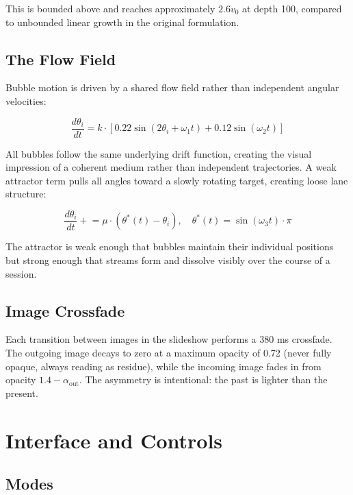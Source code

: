 \documentclass[12pt, a4paper]{article}
\begin{document}
This is bounded above and reaches approximately $2.6 v_0$ at depth 100, compared to unbounded linear growth in the original formulation.

\subsection{The Flow Field}

Bubble motion is driven by a shared flow field rather than independent angular velocities:

\begin{equation}
\frac{d\theta_i}{dt} = k \cdot \left[ 0.22 \sin(2\theta_i + \omega_1 t) + 0.12 \sin(\omega_2 t) \right]
\end{equation}

All bubbles follow the same underlying drift function, creating the visual impression of a coherent medium rather than independent trajectories. A weak attractor term pulls all angles toward a slowly rotating target, creating loose lane structure:

\begin{equation}
\frac{d\theta_i}{dt} \mathrel{+}= \mu \cdot (\theta^*(t) - \theta_i), \quad \theta^*(t) = \sin(\omega_3 t) \cdot \pi
\end{equation}

The attractor is weak enough that bubbles maintain their individual positions but strong enough that streams form and dissolve visibly over the course of a session.

\subsection{Image Crossfade}

Each transition between images in the slideshow performs a 380 ms crossfade. The outgoing image decays to zero at a maximum opacity of 0.72 (never fully opaque, always reading as residue), while the incoming image fades in from opacity $1.4 - \alpha_{\text{out}}$. The asymmetry is intentional: the past is lighter than the present.

\section{Interface and Controls}

\subsection{Modes}
\end{document}
